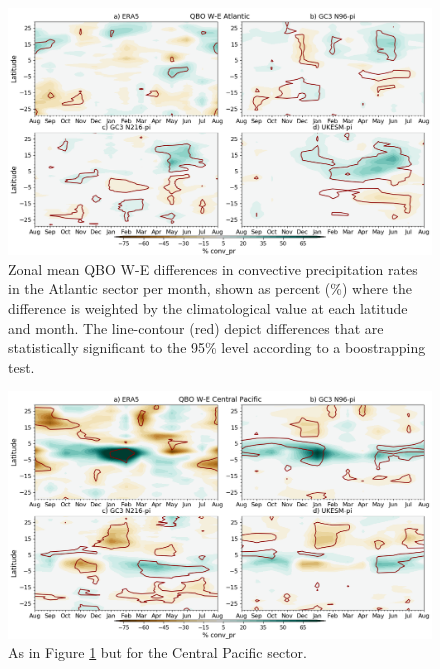 \begin{figure}[t!]
\centering
 \includegraphics[width=\linewidth]{figures/anomcmip_conv_pratlqbow.png}
\caption[Atlantic ITCZ convective precipitation differences on QBO phase.]{ Zonal mean QBO W-E differences in convective precipitation rates in the Atlantic sector per month, shown as percent (\%) where the difference is weighted by the climatological value at each latitude  and month. The line-contour (red) depict differences that are statistically significant to the 95\% level according to a boostrapping test. }
\label{fig:itczqbowatl}
\end{figure}


\begin{figure}[t!]
\centering
 \includegraphics[width=\linewidth]{figures/anomcmip_conv_prcpqbow.png}
\caption[Central Pacific ITCZ convective precipitation differences on QBO phase.]{As in Figure \ref{fig:itczqbowatl} but for the Central Pacific sector.}
\label{fig:itczqbowcp}
\end{figure}

